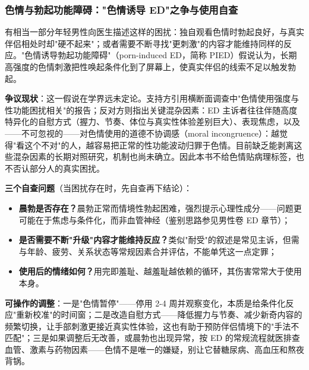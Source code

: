 \subsubsection{色情与勃起功能障碍："色情诱导 ED"之争与使用自查}

有相当一部分年轻男性向医生描述这样的困扰：独自观看色情时勃起良好，与真实伴侣相处时却"硬不起来"；或者需要不断寻找"更刺激"的内容才能维持同样的反应。"色情诱导勃起功能障碍"（porn-induced ED，简称 PIED）假说认为，长期高强度的色情刺激把性唤起条件化到了屏幕上，使真实伴侣的线索不足以触发勃起。

\textbf{争议现状}：这一假说在学界远未定论。支持方引用横断面调查中"色情使用强度与性功能困扰相关"的报告；反对方则指出关键混杂因素：ED 主诉者往往伴随高度特异化的自慰方式（握力、节奏、体位与真实性体验差别巨大）、表现焦虑，以及——不可忽视的——对色情使用的道德不协调感（moral incongruence）：越觉得"看这个不对"的人，越容易把正常的性功能波动归罪于色情。目前缺乏能剥离这些混杂因素的长期对照研究，机制也尚未确立。因此本书不给色情贴病理标签，也不否认部分人的真实困扰。

\textbf{三个自查问题}（当困扰存在时，先自查再下结论）：
\begin{itemize}
\item \textbf{晨勃是否存在？}晨勃正常而情境性勃起困难，强烈提示心理性成分——问题更可能在于焦虑与条件化，而非血管神经（鉴别思路参见男性卷 ED 章节）；
\item \textbf{是否需要不断"升级"内容才能维持反应？}类似"耐受"的叙述是常见主诉，但需与年龄、疲劳、关系状态等常规因素合并评估，不能单凭这一点定罪；
\item \textbf{使用后的情绪如何？}用完即羞耻、越羞耻越依赖的循环，其伤害常常大于使用本身。
\end{itemize}

\textbf{可操作的调整}：一是"色情暂停"——停用 2-4 周并观察变化，本质是给条件化反应"重新校准"的时间窗；二是改造自慰方式——降低握力与节奏、减少新奇内容的频繁切换，让手部刺激更接近真实性体验，这也有助于预防伴侣情境下的"手法不匹配"；三是如果调整后无改善，或晨勃也出现异常，按 ED 的常规流程就医排查血管、激素与药物因素——色情不是唯一的嫌疑，别让它替糖尿病、高血压和熬夜背锅。

